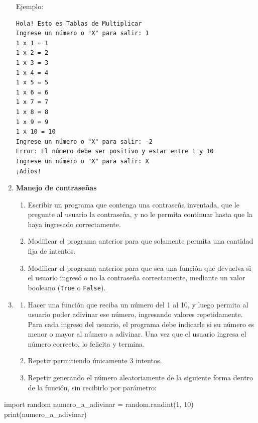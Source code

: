 \documentclass[
  letterpaper,
  DIV=11,
  numbers=noendperiod]{scrreprt}
\newenvironment{Shaded}{\begin{snugshade}}{\end{snugshade}}
\newcommand{\BuiltInTok}[1]{\textcolor[rgb]{0.00,0.23,0.31}{#1}}
\newcommand{\DecValTok}[1]{\textcolor[rgb]{0.68,0.00,0.00}{#1}}
\newcommand{\ImportTok}[1]{\textcolor[rgb]{0.00,0.46,0.62}{#1}}
\newcommand{\NormalTok}[1]{\textcolor[rgb]{0.00,0.23,0.31}{#1}}
\newcommand{\OperatorTok}[1]{\textcolor[rgb]{0.37,0.37,0.37}{#1}}
\providecommand{\tightlist}{%
  \setlength{\itemsep}{0pt}\setlength{\parskip}{0pt}}\usepackage{longtable,booktabs,array}
\begin{document}
\begin{enumerate}
  Ejemplo:

\begin{verbatim}
Hola! Esto es Tablas de Multiplicar
Ingrese un número o "X" para salir: 1
1 x 1 = 1
1 x 2 = 2
1 x 3 = 3
1 x 4 = 4
1 x 5 = 5
1 x 6 = 6
1 x 7 = 7
1 x 8 = 8
1 x 9 = 9
1 x 10 = 10
Ingrese un número o "X" para salir: -2
Error: El número debe ser positivo y estar entre 1 y 10
Ingrese un número o "X" para salir: X
¡Adios!
\end{verbatim}
\item
  \textbf{Manejo de contraseñas}

  \begin{enumerate}
  \def\labelenumii{\alph{enumii}.}
  \tightlist
  \item
    Escribir un programa que contenga una contraseña inventada, que le
    pregunte al usuario la contraseña, y no le permita continuar hasta
    que la haya ingresado correctamente.
  \item
    Modificar el programa anterior para que solamente permita una
    cantidad fija de intentos.
  \item
    Modificar el programa anterior para que sea una función que devuelva
    si el usuario ingresó o no la contraseña correctamente, mediante un
    valor booleano (\texttt{True} o \texttt{False}).
  \end{enumerate}
\item
  \begin{enumerate}
  \def\labelenumii{\alph{enumii}.}
  \item
    Hacer una función que reciba un número del 1 al 10, y luego permita
    al usuario poder adivinar ese número, ingresando valores
    repetidamente. Para cada ingreso del usuario, el programa debe
    indicarle si su número es menor o mayor al número a adivinar. Una
    vez que el usuario ingresa el número correcto, lo felicita y
    termina.
  \item
    Repetir permitiendo únicamente 3 intentos.
  \item
    Repetir generando el número aleatoriamente de la siguiente forma
    dentro de la función, sin recibirlo por parámetro:
  \end{enumerate}
\end{enumerate}

\begin{Shaded}
\begin{Highlighting}[]
\ImportTok{import}\NormalTok{ random}
\NormalTok{numero\_a\_adivinar }\OperatorTok{=}\NormalTok{ random.randint(}\DecValTok{1}\NormalTok{, }\DecValTok{10}\NormalTok{)}
\BuiltInTok{print}\NormalTok{(numero\_a\_adivinar)}
\end{Highlighting}
\end{Shaded}
\end{document}
